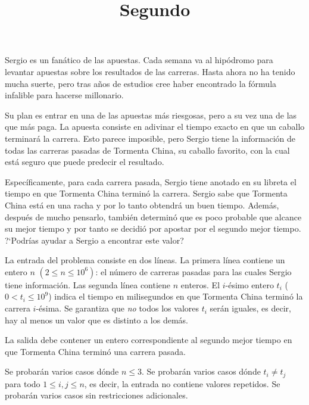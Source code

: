 \documentclass{oci}
\title{Segundo}
\newcommand{\caballo}{Tormenta China\xspace}
\begin{document}
\begin{problemDescription}
Sergio es un fanático de las apuestas.
Cada semana va al hipódromo para levantar apuestas sobre los resultados de las carreras.
Hasta ahora no ha tenido mucha suerte, pero tras años de estudios cree haber encontrado la
fórmula infalible para hacerse millonario.

Su plan es entrar en una de las apuestas más riesgosas, pero a su vez una de las que más paga.
La apuesta consiste en adivinar el tiempo exacto en que un caballo terminará la carrera.
Esto parece imposible, pero Sergio tiene la información de todas las carreras pasadas de \caballo,
su caballo favorito, con la cual está seguro que puede predecir el resultado.

Específicamente, para cada carrera pasada, Sergio tiene anotado en su libreta el tiempo en que
\caballo terminó la carrera.
Sergio sabe que \caballo está en una racha y por lo tanto obtendrá un buen tiempo.
Además, después de mucho pensarlo, también determinó que es poco probable que alcance su mejor tiempo y por
tanto se decidió por apostar por el segundo mejor tiempo.
?`Podrías ayudar a Sergio a encontrar este valor?
\end{problemDescription}

\begin{inputDescription}
La entrada del problema consiste en dos líneas.
La primera línea contiene un entero $n$ $(2 \le n \le 10^6)$: el número de carreras pasadas para
las cuales Sergio tiene información.
Las segunda línea contiene $n$ enteros.
El $i$-ésimo entero $t_i$ ($0 < t_i \leq 10^9$) indica el tiempo en milisegundos en que \caballo
terminó la carrera $i$-ésima.
Se garantiza que \emph{no} todos los valores $t_i$ serán iguales, es decir, hay al menos un valor
que es distinto a los demás.
\end{inputDescription}

\begin{outputDescription}
La salida debe contener un entero correspondiente al segundo mejor tiempo en que \caballo
terminó una carrera pasada.
\end{outputDescription}

\begin{scoreDescription}
  Se probarán varios casos dónde $n \le 3$.
  Se probarán varios casos dónde $t_i\ne t_j$ para todo $1 \leq i, j \leq n$,
  es decir, la entrada no contiene valores repetidos.
  Se probarán varios casos sin restricciones adicionales.
\end{scoreDescription}

\begin{sampleDescription}
\end{sampleDescription}
\end{document}
